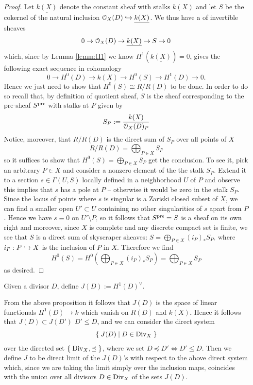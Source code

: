 	\begin{proof}
		Let $\underline{k(X)}$ denote the constant sheaf with stalks $k(X)$ and let $S$ be the cokernel of the natural inclusion $\mathcal{O}_X(D)\hookrightarrow \underline{k(X)}$. We thus have a \ses of invertible sheaves
		$$ 0 \to \mathcal{O}_X(D) \to \underline{k(X)} \to S \to 0 $$
		which, since by Lemma \ref{lemm:H1} we know $H^1(\underline{k(X)})=0$, gives the following exact sequence in cohomology
		$$ 0\to H^0(D)\to k(X) \to H^0(S) \to H^1(D) \to 0. $$
		Hence we just need to show that $H^0(S) \cong R/R(D)$ to be done. In order to do so recall that, by definition of quotient sheaf, $S$ is the sheaf corresponding to the pre-sheaf $S^{\operatorname{pre}}$ with stalks at $P$ given by
		$$ S_P := \frac{k(X)}{\mathcal{O}_X(D)_P} $$
		Notice, moreover, that $R/R(D)$ is the direct sum of $S_P$ over all points of $X$
		$$ R/R(D) = \bigoplus_{P\in X} S_P $$
		so it suffices to show that $H^0(S)=\bigoplus_{P\in X} S_P$ get the conclusion. To see it, pick an arbitrary $P\in X$ and consider a nonzero element of the the stalk $S_P$. Extend it to a section $s\in \Gamma(U,S)$ locally defined in a neighborhood $U$ of $P$ and observe this implies that $s$ has a pole at $P$ -- otherwise it would be zero in the stalk $S_P$. Since the locus of points where $s$ is singular is a Zariski closed subset of $X$, we can find a smaller open $U'\subset U$ containing no other singularities of $s$ apart from $P$. Hence we have $s\equiv 0$ on $U'\setminus P$, so it follows that $S^{\operatorname{pre}} = S$ is a sheaf on its own right and moreover, since $X$ is complete and any discrete compact set is finite, we see that $S$ is a direct sum of skyscraper sheaves: $S=\bigoplus_{P\in X} (i_P)_* S_P$, where $i_P:P\hookrightarrow X$ is the inclusion of $P$ in $X$. Therefore we find
		$$ H^0(S) = H^0\left(\bigoplus_{P\in X} (i_P)_* S_P \right) = \bigoplus_{P\in X}S_P $$
		as desired.
	\end{proof}
	\begin{defi}
		Given a divisor $D$, define $J(D) := H^1(D)^{\vee}$. 
	\end{defi}
	From the above proposition it follows that $J(D)$ is the space of linear functionals $H^1(D)\to k$ which vanish on $R(D)$ and $k(X)$. Hence it follows that $J(D)\subset J(D')$ \ABiff $D'\leq D$, and we can consider the direct system
	$$ \left\{\;  J(D) \mid D\in \operatorname{Div}_X  \; \right\} $$
	over the directed set $\left\{\;  \operatorname{Div}_X, \preceq  \; \right\}$, where we set $D\preceq D' \iff D' \leq D$. Then we define $J$ to be direct limit of the $J(D)$'s with respect to the above direct system which, since we are taking the limit simply over the inclusion maps, coincides with the union over all divisors $D\in \operatorname{Div}_X$ of the sets $J(D)$.

